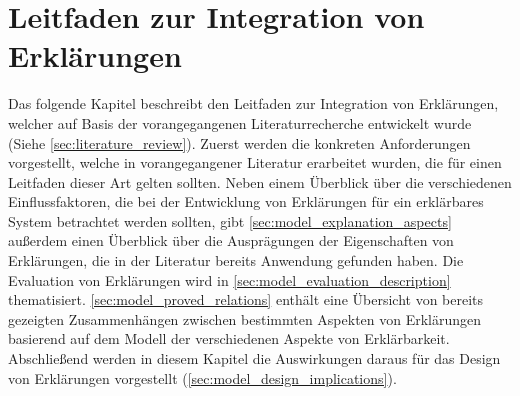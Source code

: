 \chapter{Leitfaden zur Integration von Erklärungen}

Das folgende Kapitel beschreibt den Leitfaden zur Integration von Erklärungen, welcher auf Basis der vorangegangenen Literaturrecherche entwickelt wurde (Siehe \autoref{sec:literature_review}). Zuerst werden die konkreten Anforderungen vorgestellt, welche in vorangegangener Literatur erarbeitet wurden, die für einen Leitfaden dieser Art gelten sollten. Neben einem Überblick über die verschiedenen Einflussfaktoren, die bei der Entwicklung von Erklärungen für ein erklärbares System betrachtet werden sollten, gibt \autoref{sec:model_explanation_aspects} außerdem einen Überblick über die Ausprägungen der Eigenschaften von Erklärungen, die in der Literatur bereits Anwendung gefunden haben. Die Evaluation von Erklärungen wird in \autoref{sec:model_evaluation_description} thematisiert. \autoref{sec:model_proved_relations} enthält eine Übersicht von bereits gezeigten Zusammenhängen zwischen bestimmten Aspekten von Erklärungen basierend auf dem Modell der verschiedenen Aspekte von Erklärbarkeit. Abschließend werden in diesem Kapitel die Auswirkungen daraus für das Design von Erklärungen vorgestellt (\autoref{sec:model_design_implications}).

% 





\newpage

